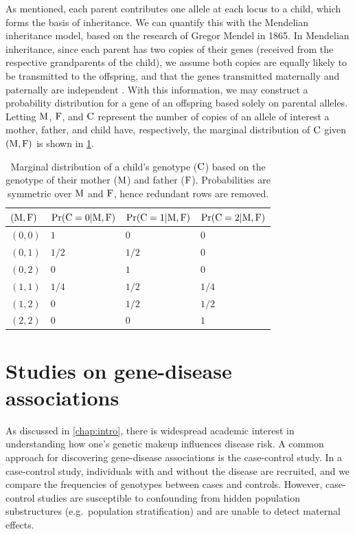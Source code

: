 As mentioned, each parent contributes one allele at each locus to a child, which forms the basis of inheritance.
We can quantify this with the Mendelian inheritance model, based on the research of Gregor Mendel in 1865.
In Mendelian inheritance, since each parent has two copies of their genes (received from the respective grandparents of the child), we assume both copies are equally likely to be transmitted to the offspring, and that the genes transmitted maternally and paternally are independent \cite{Stra99}.
With this information, we may construct a probability distribution for a gene of an offspring based solely on parental alleles.
Letting ${\rm M}$, ${\rm F}$, and $\CC$ represent the number of copies of an allele of interest a mother, father, and child have, respectively, the marginal distribution of $\CC$ given $(\MM, \FF)$ is shown in \cref{tab:Mendel}.
\begin{table}[h]
    \caption[Marginal distribution of $\CC$ given $(\MM, \FF)$.]{Marginal distribution of a child's genotype ($\CC$) based on the genotype of their mother (${\rm M}$) and father (${\rm F}$).  Probabilities are symmetric over ${\rm M}$ and ${\rm F}$, hence redundant rows are removed.\label{tab:Mendel}}
    \begin{center}
    \begin{tabular}{l|lll}
    $(\MM,\FF)$ & $\Pr({\rm C} = 0 | {\rm M}, {\rm F})$ & $\Pr({\rm C} = 1 | {\rm M}, {\rm F})$ & $\Pr({\rm C} = 2 | {\rm M}, {\rm F})$ \\ \hline
    $(0,0)$     & $1$            & $0$            & $0$            \\
    $(0,1)$     & $1/2$          & $1/2$          & $0$            \\
    $(0,2)$     & $0$            & $1$            & $0$            \\
    $(1,1)$     & $1/4$          & $1/2$          & $1/4$          \\
    $(1,2)$     & $0$            & $1/2$          & $1/2$          \\
    $(2,2)$     & $0$            & $0$            & $1$           
    \end{tabular}
\end{center}
\end{table}
\section{Studies on gene-disease associations} \label{sec:studies}

As discussed in \cref{chap:intro}, there is widespread academic interest in understanding how one's genetic makeup influences disease risk.
A common approach for discovering gene-disease associations is the case-control study.
In a case-control study, individuals with and without the disease are recruited, and we compare the frequencies of genotypes between cases and controls.
However, case-control studies are susceptible to confounding from hidden population substructures (e.g.\ population stratification) and are unable to detect maternal effects.

